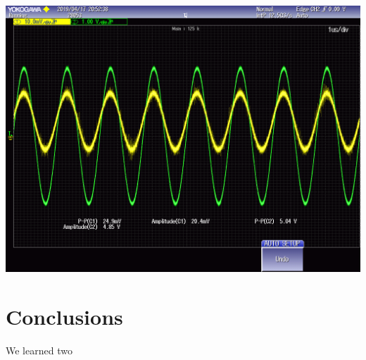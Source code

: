 \documentclass[journal]{IEEEtran}
\begin{document}
\begingroup
    \centering
    \medskip
    \includegraphics[width=\columnwidth]{images/lab8_012.png}
    \label{fig:phaseshift40}
    \medskip
\endgroup

\section{Conclusions}
\noindent We learned two


\printbibliography
\end{document}
